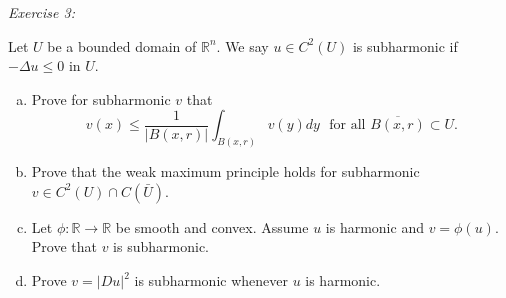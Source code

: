 \documentclass{article}
\newcommand{\exercise}[2]{
\vspace{0.2in}\begin{mdframed}[
  backgroundcolor=problem,
  skipabove=\topsep,
  skipbelow=\topsep
  ]
  \emph{Exercise {#1}:} {#2}
\end{mdframed}}
\newcommand{\R}{\mathbb{R}}
\begin{document}
    \exercise{3}{Let $U$ be a bounded domain of $\R^n$. We say $u\in C^2(U)$ is subharmonic if $-\Delta u \le 0$ in $U$.
    \begin{enumerate}[(a)]
      \item Prove for subharmonic $v$ that\[ v(x) \le \frac{1}{|B(x,r)|}\int_{B(x,r)}v(y)dy\,\,\text{ for all $\overline{B(x,r)}\subset U$.}\]
      \item Prove that the weak maximum principle holds for subharmonic $v\in C^2(U)\cap C(\bar{U})$.
      \item Let $\phi: \R\to\R$ be smooth and convex. Assume $u$ is harmonic and $v=\phi(u)$. Prove that $v$ is subharmonic.
      \item Prove $v=|Du|^2$ is subharmonic whenever $u$ is harmonic.
    \end{enumerate}
    }
\end{document}
